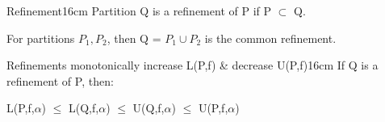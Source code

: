     \vspace{0.5cm}

    

    \begin{definition}{Refinement}{16cm}
        Partition Q is a {\color{lblue} refinement} of P if P $\subset$ Q.

        For partitions $P_1, P_2$, then Q = $P_1 \cup P_2$ is the common refinement.
    \end{definition}

    \newpage



    \begin{wtheorem}{Refinements monotonically increase L(P,f)
    \& decrease U(P,f)}{16cm}
        If Q is a refinement of P, then:

        \hspace{0.5cm}
        L(P,f,$\alpha$) $\leq$ L(Q,f,$\alpha$)
        $\leq$ U(Q,f,$\alpha$) $\leq$ U(P,f,$\alpha$)
    \end{wtheorem}

